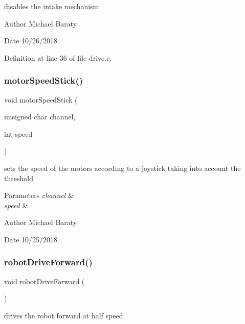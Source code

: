disables the intake mechanism 

\begin{DoxyAuthor}{Author}
Michael Baraty 
\end{DoxyAuthor}
\begin{DoxyDate}{Date}
10/26/2018 
\end{DoxyDate}


Definition at line 36 of file drive.\+c.

\mbox{\label{drive_8h_abccc286b38b665e7171bee0b5a2c2834}} 
\subsubsection{motor\+Speed\+Stick()}
{\footnotesize\ttfamily void motor\+Speed\+Stick (\begin{DoxyParamCaption}\item[{unsigned char}]{channel,  }\item[{int}]{speed }\end{DoxyParamCaption})}



sets the speed of the motors according to a joystick taking into account the threshold 


\begin{DoxyParams}{Parameters}
{\em channel} & \\
\hline
{\em speed} & \\
\hline
\end{DoxyParams}
\begin{DoxyAuthor}{Author}
Michael Baraty 
\end{DoxyAuthor}
\begin{DoxyDate}{Date}
10/25/2018 
\end{DoxyDate}
\mbox{\label{drive_8h_af9b0c744a3f92085b9e6d2c9a3341492}} 
\subsubsection{robot\+Drive\+Forward()}
{\footnotesize\ttfamily void robot\+Drive\+Forward (\begin{DoxyParamCaption}{ }\end{DoxyParamCaption})}



drives the robot forward at half speed 

